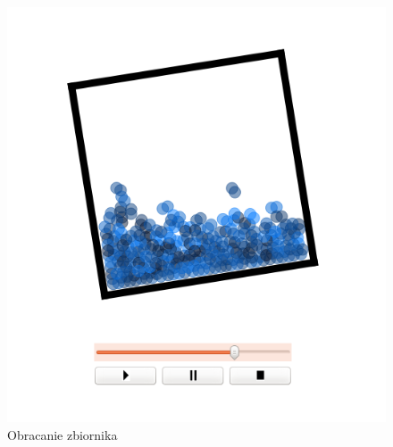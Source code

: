 \begin{minipage}{0.5\textwidth}
\begin{figure}[H]
 \begin{center} 
  \includegraphics[width=\textwidth]{./rysunki/obrot_niestabilny} 
 \end{center}
 \caption{Obracanie zbiornika}
 \label{fig:obrot_niestabilny} 
\end{figure}
\end{minipage}
~
